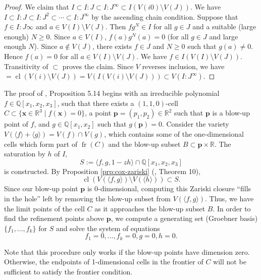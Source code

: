 \documentclass[
]{book}
\theoremstyle{definition}
\theoremstyle{definition}
\theoremstyle{definition}
\theoremstyle{definition}
\theoremstyle{remark}
\begin{document}
\begin{proof}
We claim that \(I \subset I:J \subset I:J^\infty \subset I(V(i0) \setminus V(J))\). We have \(I \subset I:J \subset I:J^2 \subset \cdots \subset I:J^\infty\) by the ascending chain condition.
Suppose that \(f \in I:J\infty\) and \(a \in V(I) \setminus V(J)\). Then \(fg^N \in I\) for all \(g \in J\) and a suitable (large enough) \(N\ge 0\). Since \(a \in V(I)\), \(f(a)g^N(a) = 0\) (for all \(g\in J\) and large enough \(N\)). Since \(a \not \in V(J)\), there exists \(f \in J\) and \(N \ge 0\) such that \(g(a) \ne 0\). Hence \(f(a) = 0\) for all \(a \in V(I) \setminus V(J)\). We have \(f \in I(V(I) \setminus V(J))\). Transitivity of \(\subset\) proves the claim. Since \(V\) reverses inclusion, we have \(= {\operatorname{cl} \left(  V(i) \setminus V(J)  \right)} = V(I(V(i) \setminus V(J))) \subset V(I:J^\infty)\).
\end{proof}

The proof of \citet{lazard10}, Proposition 5.14 begins with an irreducible polynomial \(f \in \mathbb{Q}[x_1,x_2,x_3]\), such that there exists a \((1,1,0)\)-cell \(C \subset \{ \mathbf{x} \in \mathbb{R}^3 \mid f(\mathbf{x}) = 0 \}\), a point \(\mathbf{p} = (p_1,p_2) \in \mathbb{R}^2\) such that \(\mathbf{p}\) is a blow-up point of \(f\), and \(g \in \mathbb{Q}[x_1,x_2]\) such that \(g(\mathbf{p}) = 0\).
Consider the variety \(V(\langle f \rangle + \langle g \rangle ) = V(f) \cap V(g)\), which contains some of the one-dimensional cells which form part of \({\operatorname{fr} \left( C \right)}\) and the blow-up subset \(B \subset \mathbf{p} \times \mathbb{R}\).
The saturation by \(h\) of \(I\),
\[
S := \langle f, g, 1 - zh \rangle \cap \mathbb{Q}[x_1,x_2,x_3]
\]
is constructed.
By Proposition \ref{prp:cox-zariski} (\citet{cox2013}, Theorem 10),
\[
{\operatorname{cl} \left(  V(\langle f,g \rangle) \setminus V(\langle h \rangle)  \right)} \subset S.
\]
Since our blow-up point \(\mathbf{p}\) is \(0\)-dimensional, computing this Zariski closure ``fills in the hole'' left by removing the blow-up subset from \(V(\langle f,g \rangle)\). Thus, we have the limit points of the cell \(C\) as it approaches the blow-up subset \(B\).
In order to find the refinement points above \(\mathbf{p}\), we compute a generating set (Groebner basis) \(\{ f_1,\ldots,f_k \}\) for \(S\) and solve the system of equations
\[
f_1 = 0, \ldots, f_k = 0, g = 0, h = 0.
\]

Note that this procedure only works if the blow-up points have dimension zero. Otherwise, the endpoints of 1-dimensional cells in the frontier of \(C\) will not be sufficient to satisfy the frontier condition.
\end{document}
